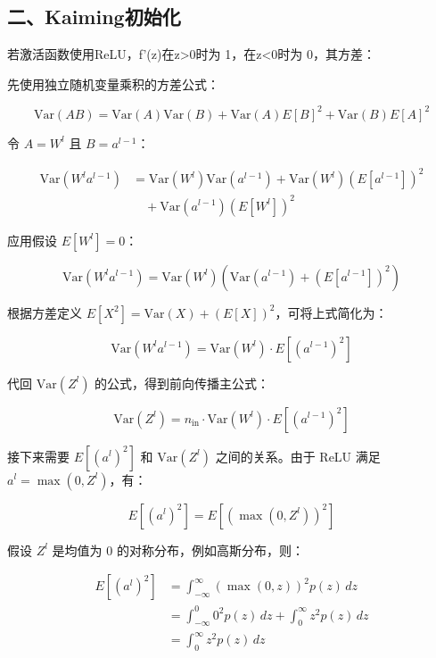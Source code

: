 \hypertarget{ux4e8ckaimingux521dux59cbux5316}{%
\subsection{二、Kaiming初始化}\label{ux4e8ckaimingux521dux59cbux5316}}

若激活函数使用ReLU，f'(z)在z\textgreater0时为 1，在z\textless0时为 0，其方差：

先使用独立随机变量乘积的方差公式：

\[
\mathrm{Var}(AB)
=\mathrm{Var}(A)\mathrm{Var}(B)
+\mathrm{Var}(A)E[B]^2
+\mathrm{Var}(B)E[A]^2
\]

令 \(A=W^l\) 且 \(B=a^{l-1}\)：

\[
\begin{aligned}
\mathrm{Var}(W^la^{l-1})
&=\mathrm{Var}(W^l)\mathrm{Var}(a^{l-1})
+\mathrm{Var}(W^l)(E[a^{l-1}])^2\\
&\quad+\mathrm{Var}(a^{l-1})(E[W^l])^2
\end{aligned}
\]

应用假设 \(E[W^l]=0\)：

\[
\mathrm{Var}(W^la^{l-1})
=\mathrm{Var}(W^l)\left(\mathrm{Var}(a^{l-1})+(E[a^{l-1}])^2\right)
\]

根据方差定义 \(E[X^2]=\mathrm{Var}(X)+(E[X])^2\)，可将上式简化为：

\[
\mathrm{Var}(W^la^{l-1})
=\mathrm{Var}(W^l)\cdot E[(a^{l-1})^2]
\]

代回 \(\mathrm{Var}(Z^l)\) 的公式，得到前向传播主公式：

\[
\mathrm{Var}(Z^l)=n_{\mathrm{in}}\cdot \mathrm{Var}(W^l)\cdot E[(a^{l-1})^2]
\]

接下来需要 \(E[(a^l)^2]\) 和 \(\mathrm{Var}(Z^l)\) 之间的关系。由于 ReLU 满足 \(a^l=\max(0,Z^l)\)，有：

\[
E[(a^l)^2]=E[(\max(0,Z^l))^2]
\]

假设 \(Z^l\) 是均值为 0 的对称分布，例如高斯分布，则：

\[
\begin{aligned}
E[(a^l)^2]
&=\int_{-\infty}^{\infty}(\max(0,z))^2p(z)\,dz\\
&=\int_{-\infty}^{0}0^2p(z)\,dz+\int_{0}^{\infty}z^2p(z)\,dz\\
&=\int_{0}^{\infty}z^2p(z)\,dz
\end{aligned}
\]

